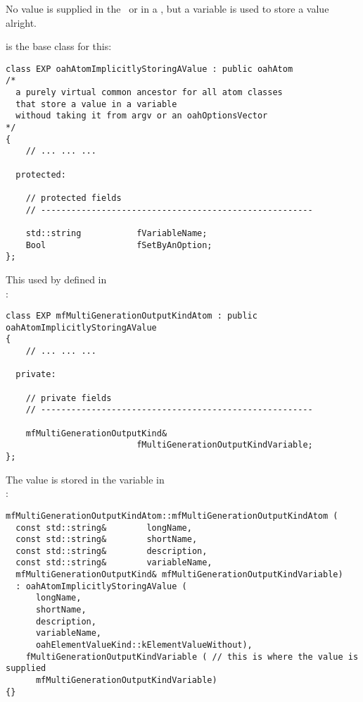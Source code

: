No value is supplied in the \CLI\ or in a , but a variable is used to store a value alright.

 is the base class   for this:
\begin{lstlisting}[language=CPlusPlus]
class EXP oahAtomImplicitlyStoringAValue : public oahAtom
/*
  a purely virtual common ancestor for all atom classes
  that store a value in a variable
  withoud taking it from argv or an oahOptionsVector
*/
{
	// ... ... ...

  protected:

    // protected fields
    // ------------------------------------------------------

    std::string           fVariableName;
    Bool                  fSetByAnOption;
};
\end{lstlisting}

This used by  defined in \\
:
\begin{lstlisting}[language=CPlusPlus]
class EXP mfMultiGenerationOutputKindAtom : public oahAtomImplicitlyStoringAValue
{
	// ... ... ...

  private:

    // private fields
    // ------------------------------------------------------

    mfMultiGenerationOutputKind&
                          fMultiGenerationOutputKindVariable;
};
\end{lstlisting}

The value is stored in the variable in \\
:
\begin{lstlisting}[language=CPlusPlus]
mfMultiGenerationOutputKindAtom::mfMultiGenerationOutputKindAtom (
  const std::string&        longName,
  const std::string&        shortName,
  const std::string&        description,
  const std::string&        variableName,
  mfMultiGenerationOutputKind& mfMultiGenerationOutputKindVariable)
  : oahAtomImplicitlyStoringAValue (
      longName,
      shortName,
      description,
      variableName,
      oahElementValueKind::kElementValueWithout),
    fMultiGenerationOutputKindVariable ( // this is where the value is supplied
      mfMultiGenerationOutputKindVariable)
{}
\end{lstlisting}


